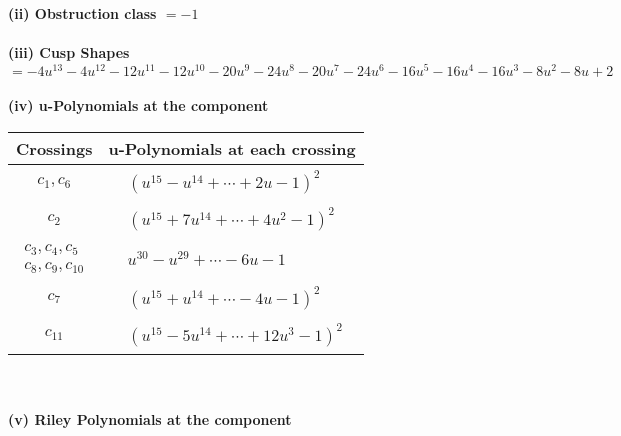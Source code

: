 \documentclass[1p]{elsarticle_modified}
\theoremstyle{definition}
\begin{document}
\flushleft \textbf{(ii) Obstruction class $= -1$}\\~\\
\flushleft \textbf{(iii) Cusp Shapes $= -4 u^{13}-4 u^{12}-12 u^{11}-12 u^{10}-20 u^9-24 u^8-20 u^7-24 u^6-16 u^5-16 u^4-16 u^3-8 u^2-8 u+2$}\\~\\
\newpage\renewcommand{\arraystretch}{1}
\flushleft \textbf{(iv) u-Polynomials at the component}\newline \\
\begin{tabular}{m{50pt}|m{274pt}}
Crossings & \hspace{64pt}u-Polynomials at each crossing \\
\hline $$\begin{aligned}c_{1},c_{6}\end{aligned}$$&$\begin{aligned}
&(u^{15}- u^{14}+\cdots+2 u-1)^{2}
\end{aligned}$\\
\hline $$\begin{aligned}c_{2}\end{aligned}$$&$\begin{aligned}
&(u^{15}+7 u^{14}+\cdots+4 u^2-1)^{2}
\end{aligned}$\\
\hline $$\begin{aligned}c_{3},c_{4},c_{5}\\c_{8},c_{9},c_{10}\end{aligned}$$&$\begin{aligned}
&u^{30}- u^{29}+\cdots-6 u-1
\end{aligned}$\\
\hline $$\begin{aligned}c_{7}\end{aligned}$$&$\begin{aligned}
&(u^{15}+u^{14}+\cdots-4 u-1)^{2}
\end{aligned}$\\
\hline $$\begin{aligned}c_{11}\end{aligned}$$&$\begin{aligned}
&(u^{15}-5 u^{14}+\cdots+12 u^3-1)^{2}
\end{aligned}$\\
\hline
\end{tabular}\\~\\
\newpage\renewcommand{\arraystretch}{1}
\flushleft \textbf{(v) Riley Polynomials at the component}\newline \\
\end{document}
